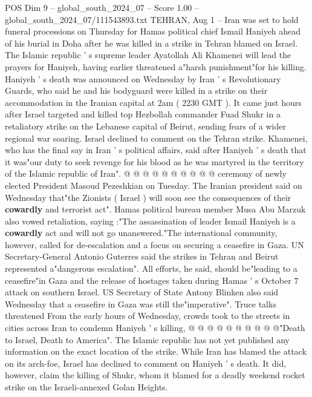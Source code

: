 \begin{textsample}{POS Dim 9 – global\_south\_2024\_07 – Score 1.00 – global\_south\_2024\_07/111543893.txt}  \label{ex:f9_pos_105}
TEHRAN, Aug 1 -- Iran was set to hold funeral processions on Thursday for Hamas political chief Ismail Haniyeh ahead of his burial in Doha after he was killed in a strike in Tehran blamed on Israel.
The Islamic republic ' s supreme leader Ayatollah Ali Khamenei will lead the prayers for Haniyeh, having earlier threatened a"harsh punishment"for his killing.
Haniyeh ' s death was announced on Wednesday by Iran ' s Revolutionary Guards, who said he and his bodyguard were killed in a strike on their accommodation in the Iranian capital at 2am ( 2230 GMT ).
It came just hours after Israel targeted and killed top Hezbollah commander Fuad Shukr in a retaliatory strike on the Lebanese capital of Beirut, sending fears of a wider regional war soaring.
Israel declined to comment on the Tehran strike.
Khamenei, who has the final say in Iran ' s political affairs, said after Haniyeh ' s death that it was"our duty to seek revenge for his blood as he was martyred in the territory of the Islamic republic of Iran". @ @ @ @ @ @ @ @ @ @ ceremony of newly elected President Masoud Pezeshkian on Tuesday.
The Iranian president said on Wednesday that"the Zionists ( Israel ) will soon see the consequences of their \textbf{cowardly} and terrorist act".
Hamas political bureau member Musa Abu Marzuk also vowed retaliation, saying :"The assassination of leader Ismail Haniyeh is a \textbf{cowardly} act and will not go unanswered."The international community, however, called for de-escalation and a focus on securing a ceasefire in Gaza.
UN Secretary-General Antonio Guterres said the strikes in Tehran and Beirut represented a"dangerous escalation".
All efforts, he said, should be"leading to a ceasefire"in Gaza and the release of hostages taken during Hamas ' s October 7 attack on southern Israel.
US Secretary of State Antony Blinken also said Wednesday that a ceasefire in Gaza was still the"imperative".
Truce talks threatened From the early hours of Wednesday, crowds took to the streets in cities across Iran to condemn Haniyeh ' s killing, @ @ @ @ @ @ @ @ @ @"Death to Israel, Death to America".
The Islamic republic has not yet published any information on the exact location of the strike.
While Iran has blamed the attack on its arch-foe, Israel has declined to comment on Haniyeh ' s death.
It did, however, claim the killing of Shukr, whom it blamed for a deadly weekend rocket strike on the Israeli-annexed Golan Heights.

\end{textsample}
